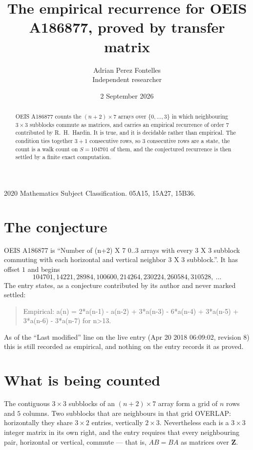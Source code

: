 \documentclass[11pt,a4paper]{article}
\title{The empirical recurrence for OEIS A186877, proved by transfer matrix}
\author{Adrian Perez Fontelles\\ \small Independent researcher}
\date{2 September 2026}
\theoremstyle{plain}
\theoremstyle{definition}
\begin{document}
\maketitle

\begin{abstract}
OEIS A186877 counts the $(n+2)\times7$ arrays over $\{0,\dots,3\}$ in which
neighbouring $3\times3$ subblocks commute as matrices, and carries an empirical
recurrence
of order $7$ contributed by R.~H.~Hardin. It is true, and it is decidable rather than
empirical. The condition ties together $3+1$ consecutive rows, so $3$ consecutive rows are
a state, the count is a walk count on $S=104701$ of them, and the conjectured recurrence is then
settled by a finite exact computation.
\end{abstract}

\noindent\small 2020 Mathematics Subject Classification. 05A15, 15A27, 15B36.\normalsize

\section{The conjecture}

OEIS A186877 is ``Number of (n+2) X 7 0..3 arrays with every 3 X 3 subblock commuting with each horizontal and vertical neighbor 3 X 3 subblock.''. It has offset $1$ and begins
\[
104701, 14221, 28984, 100600, 214264, 230224, 260584, 310528,\ \dots
\]
The entry states, as a conjecture contributed by its author and never marked settled:
\begin{quote}
Empirical: a(n) = 2*a(n-1) - a(n-2) + 3*a(n-3) - 6*a(n-4) + 3*a(n-5) + 3*a(n-6) - 3*a(n-7) for n>13.
\end{quote}
As of the ``Last modified'' line on the live entry (Apr 20 2018 06:09:02, revision 8) this is still
recorded as empirical, and nothing on the entry records it as proved.

\section{What is being counted}

The contiguous $3\times3$ subblocks of an $(n+2)\times7$ array form a grid of $n$
rows and $5$ columns. Two subblocks that are neighbours in that
grid OVERLAP: horizontally they share $3\times2$ entries, vertically
$2\times3$. Nevertheless each is a $3\times3$ integer matrix in its own right, and
the entry requires that every neighbouring pair, horizontal or vertical, commute --- that is,
$AB=BA$ as matrices over $\mathbf{Z}$.
\end{document}
